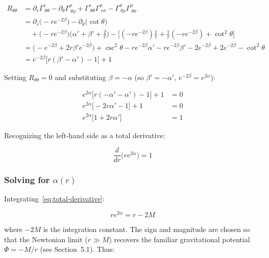 \documentclass[12pt]{article}
\theoremstyle{definition}
\theoremstyle{remark}
\begin{document}
\begin{align}
  R_{\theta\theta} &= \partial_{r}\Gamma^{r}_{\ \theta\theta} - \partial_{\theta}\Gamma^{\rho}_{\ \theta\rho}
                     + \Gamma^{r}_{\ \theta\theta}\Gamma^{\sigma}_{\ r\sigma}
                     - \Gamma^{\sigma}_{\ \theta\rho}\Gamma^{\rho}_{\ \theta\sigma} \\[4pt]
  &= \partial_{r}\big(-r e^{-2\beta}\big) - \partial_{\theta}\big(\cot\theta\big) \\
  &\quad + \big(-r e^{-2\beta}\big)\Big(\alpha' + \beta' + \frac{2}{r}\Big)
     - \big[(-r e^{-2\beta})\tfrac{1}{r} + \tfrac{1}{r}(-r e^{-2\beta}) + \cot^{2}\theta\big] \nonumber \\[4pt]
  &= \big(-e^{-2\beta} + 2r\beta' e^{-2\beta}\big) + \csc^{2}\theta
     - r e^{-2\beta}\alpha' - r e^{-2\beta}\beta' - 2e^{-2\beta}
     + 2e^{-2\beta} - \cot^{2}\theta \\[4pt]
  &= e^{-2\beta}\big[r(\beta' - \alpha') - 1\big] + 1
\end{align}

Setting $R_{\theta\theta} = 0$ and substituting $\beta = -\alpha$ (so $\beta' = -\alpha'$, $e^{-2\beta} = e^{2\alpha}$):

\begin{align}
  e^{2\alpha}\big[r(-\alpha' - \alpha') - 1\big] + 1 &= 0 \\
  e^{2\alpha}\big[-2r\alpha' - 1\big] + 1 &= 0 \\
  e^{2\alpha}\big[1 + 2r\alpha'\big] &= 1
\end{align}

Recognizing the left-hand side as a total derivative:

\begin{equation}\label{eq:total-derivative}
  \boxed{\;\frac{d}{dr}\!\Big(re^{2\alpha}\Big) = 1\;}
\end{equation}

\subsubsection{Solving for \texorpdfstring{$\alpha(r)$}{alpha(r)}}

Integrating~\eqref{eq:total-derivative}:

\begin{equation}
  re^{2\alpha} = r - 2M
\end{equation}

where $-2M$ is the integration constant. The sign and magnitude are chosen so that the Newtonian limit ($r \gg M$) recovers the familiar gravitational potential $\Phi = -M/r$ (see Section~5.1). Thus:
\end{document}
